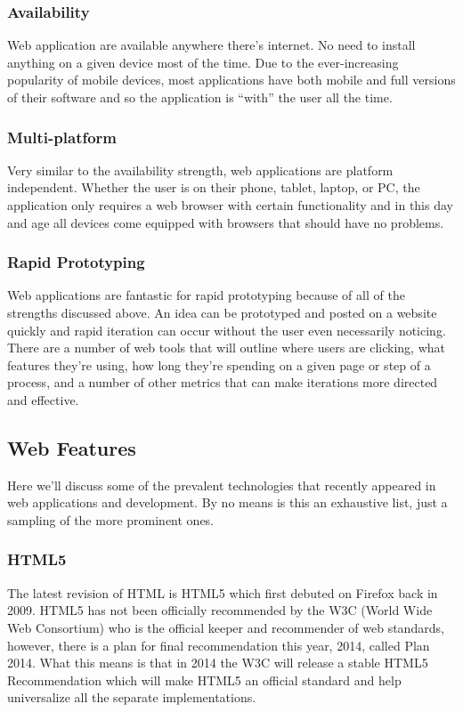 \documentclass[11pt]{article}
\begin{document}
\subsubsection{Availability}
Web application are available anywhere there's internet. No need to install anything on a given device most of the time. Due to the ever-increasing popularity of mobile devices, most applications have both mobile and full versions of their software and so the application is ``with'' the user all the time.

\subsubsection{Multi-platform}
Very similar to the availability strength, web applications are platform independent. Whether the user is on their phone, tablet, laptop, or PC, the application only requires a web browser with certain functionality and in this day and age all devices come equipped with browsers that should have no problems.

\subsubsection{Rapid Prototyping}
Web applications are fantastic for rapid prototyping because of all of the strengths discussed above. An idea can be prototyped and posted on a website quickly and rapid iteration can occur without the user even necessarily noticing. There are a number of web tools that will outline where users are clicking, what features they're using, how long they're spending on a given page or step of a process, and a number of other metrics that can make iterations more directed and effective.

\subsection{Web Features}
Here we'll discuss some of the prevalent technologies that recently appeared in web applications and development. By no means is this an exhaustive list, just a sampling of the more prominent ones.

\subsubsection{HTML5}
The latest revision of HTML is HTML5 which first debuted on Firefox back in 2009. \cite{EvolutionOfWeb} HTML5 has not been officially recommended by the W3C (World Wide Web Consortium) who is the official keeper and recommender of web standards, however, there is a plan for final recommendation this year, 2014, called Plan 2014. \cite{Plan2014} What this means is that in 2014 the W3C will release a stable HTML5 Recommendation which will make HTML5 an official standard and help universalize all the separate implementations.
\end{document}
